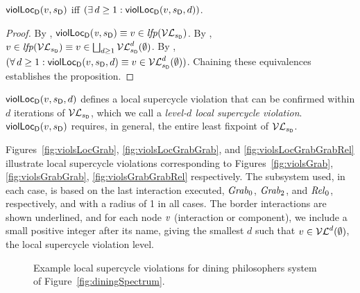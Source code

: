 \begin{proposition}
\label{prop:locViol-equiv-locViolDist}
$\mathsf{violLoc}_{\mathsf{D}}(v,s_\mathsf{D})$ iff $(\exists\, d \ge 1: \mathsf{violLoc}_{\mathsf{D}}(v,s_\mathsf{D},d))$.
\end{proposition}
%
\begin{proof}
By , $\mathsf{violLoc}_{\mathsf{D}}(\mathit{v},s_\mathsf{D}) \equiv v \in \mathit{lfp}(\mathcal{VL}_{s_\mathsf{D}})$.
By , $v \in \mathit{lfp}(\mathcal{VL}_{s_\mathsf{D}}) \equiv v \in \bigsqcup_{d \ge 1} \mathcal{VL}_{s_\mathsf{D}}^{d}(\emptyset)$.
By , $(\forall\, d \ge 1: \mathsf{violLoc}_{\mathsf{D}}(v,s_\mathsf{D},d) \equiv v \in \mathcal{VL}_{s_\mathsf{D}}^{d}(\emptyset))$.
Chaining these equivalences establishes the proposition.
\end{proof}
%
$\mathsf{violLoc}_{\mathsf{D}}(v,s_\mathsf{D},d)$ defines a local supercycle violation that can be confirmed within $d$ iterations of $\mathcal{VL}_{s_\mathsf{D}}$, which we call a
\emph{level-$d$ local supercycle violation}.
$\mathsf{violLoc}_{\mathsf{D}}(v,s_\mathsf{D})$ requires, in general, the entire least fixpoint of $\mathcal{VL}_{s_\mathsf{D}}$.



\begin{example}
\label{exm:loc-dphils-viols}
Figures~\ref{fig:violsLocGrab}, \ref{fig:violsLocGrabGrab}, and \ref{fig:violsLocGrabGrabRel} illustrate local supercycle violations corresponding to
Figures~\ref{fig:violsGrab}, \ref{fig:violsGrabGrab}, \ref{fig:violsGrabGrabRel} respectively. The subsystem used, in each case, is based on the last interaction
executed, \ie $\mathit{Grab}_0$, $\mathit{Grab}_2$, and $\mathit{Rel}_0$, respectively, and with a radius of 1 in all cases.
The border interactions are shown underlined, and 
for each node $\mathit{v}$ (interaction or component), we include a small positive integer after its name, giving the smallest $d$ such that $v \in \mathcal{VL}^{d}(\emptyset)$, 
\ie the local supercycle violation level.
\end{example}



\begin{figure*}[ht]
  \begin{center}
      \quad \quad
       \quad \quad
      \caption{Example local supercycle violations for dining philosophers system of Figure~\ref{fig:diningSpectrum}.}
       \label{fig:localDphilsViolations}
  \end{center}
\end{figure*}










